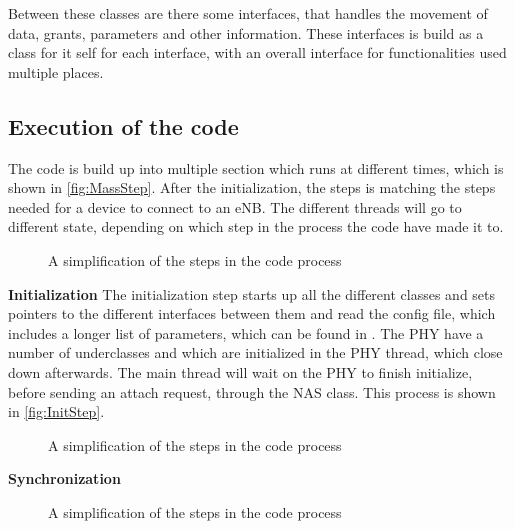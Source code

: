 Between these classes are there some interfaces, that handles the movement of data, grants, parameters and other information. These interfaces is build as a class for it self for each interface, with an overall interface for functionalities used multiple places.

\subsection{Execution of the code}
The code is build up into multiple section which runs at different times, which is shown in \autoref{fig:MassStep}. After the initialization, the steps is matching the steps needed for a device to connect to an eNB. The different threads will go to different state, depending on which step in the process the code have made it to.

\begin{figure}[H]
\centering
{}
\resizebox{0.5\textwidth}{!}{
}
\caption{A simplification of the steps in the code process}
\label{fig:MassStep}
\end{figure}

\textbf{Initialization}
The initialization step starts up all the different classes and sets pointers to the different interfaces between them and read the config file, which includes a longer list of parameters, which can be found in . The PHY have a number of underclasses and which are initialized in the PHY thread, which close down afterwards. The main thread will wait on the PHY to finish initialize, before sending an attach request, through the NAS class. This process is shown in \autoref{fig:InitStep}.

\begin{figure}[H]
\centering
{}
\resizebox{0.5\textwidth}{!}{
}
\caption{A simplification of the steps in the code process}
\label{fig:InitStep}
\end{figure}


\textbf{Synchronization}

\begin{figure}[H]
\centering
{}
\resizebox{0.5\textwidth}{!}{
}
\caption{A simplification of the steps in the code process}
\label{fig:RecvState}
\end{figure}




















